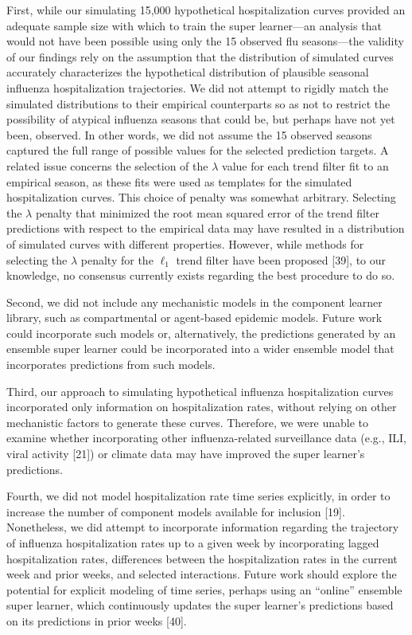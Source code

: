 \documentclass[10pt,letterpaper]{article}
\begin{document}
First, while our simulating 15,000 hypothetical hospitalization curves
provided an adequate sample size with which to train the super
learner---an analysis that would not have been possible using only the
15 observed flu seasons---the validity of our findings rely on the
assumption that the distribution of simulated curves accurately
characterizes the hypothetical distribution of plausible seasonal
influenza hospitalization trajectories. We did not attempt to rigidly
match the simulated distributions to their empirical counterparts so as
not to restrict the possibility of atypical influenza seasons that could
be, but perhaps have not yet been, observed. In other words, we did not
assume the 15 observed seasons captured the full range of possible
values for the selected prediction targets. A related issue concerns the
selection of the \(\lambda\) value for each trend filter fit to an
empirical season, as these fits were used as templates for the simulated
hospitalization curves. This choice of penalty was somewhat arbitrary.
Selecting the \(\lambda\) penalty that minimized the root mean squared
error of the trend filter predictions with respect to the empirical data
may have resulted in a distribution of simulated curves with different
properties. However, while methods for selecting the \(\lambda\) penalty
for the \(\ell_1\) trend filter have been proposed {[}39{]}, to our
knowledge, no consensus currently exists regarding the best procedure to
do so.

Second, we did not include any mechanistic models in the component
learner library, such as compartmental or agent-based epidemic models.
Future work could incorporate such models or, alternatively, the
predictions generated by an ensemble super learner could be incorporated
into a wider ensemble model that incorporates predictions from such
models.

Third, our approach to simulating hypothetical influenza hospitalization
curves incorporated only information on hospitalization rates, without
relying on other mechanistic factors to generate these curves.
Therefore, we were unable to examine whether incorporating other
influenza-related surveillance data (e.g., ILI, viral activity {[}21{]})
or climate data may have improved the super learner's predictions.

Fourth, we did not model hospitalization rate time series explicitly, in
order to increase the number of component models available for inclusion
{[}19{]}. Nonetheless, we did attempt to incorporate information
regarding the trajectory of influenza hospitalization rates up to a
given week by incorporating lagged hospitalization rates, differences
between the hospitalization rates in the current week and prior weeks,
and selected interactions. Future work should explore the potential for
explicit modeling of time series, perhaps using an ``online'' ensemble
super learner, which continuously updates the super learner's
predictions based on its predictions in prior weeks {[}40{]}.
\end{document}

